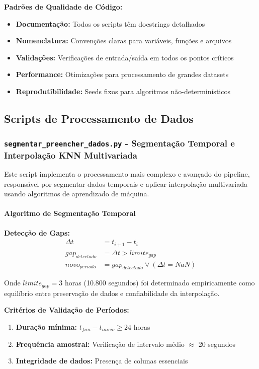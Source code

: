 \textbf{Padrões de Qualidade de Código:}

\begin{itemize}
    \item \textbf{Documentação:} Todos os scripts têm docstrings detalhados
    \item \textbf{Nomenclatura:} Convenções claras para variáveis, funções e arquivos
    \item \textbf{Validações:} Verificações de entrada/saída em todos os pontos críticos
    \item \textbf{Performance:} Otimizações para processamento de grandes datasets
    \item \textbf{Reprodutibilidade:} Seeds fixos para algoritmos não-determinísticos
\end{itemize}

\subsection{Scripts de Processamento de Dados}

\subsubsection{\texttt{segmentar\_preencher\_dados.py} - Segmentação Temporal e Interpolação KNN Multivariada}

Este script implementa o processamento mais complexo e avançado do pipeline, responsável por segmentar dados temporais e aplicar interpolação multivariada usando algoritmos de aprendizado de máquina.

\paragraph{Algoritmo de Segmentação Temporal}

\textbf{Detecção de Gaps:}
\begin{align}
\Delta t &= t_{i+1} - t_i \\
gap_{detectado} &= \Delta t > limite_{gap} \\
novo_{periodo} &= gap_{detectado} \lor (\Delta t = NaN)
\end{align}

Onde $limite_{gap} = 3$ horas (10.800 segundos) foi determinado empiricamente como equilíbrio entre preservação de dados e confiabilidade da interpolação.

\textbf{Critérios de Validação de Períodos:}
\begin{enumerate}
    \item \textbf{Duração mínima:} $t_{fim} - t_{inicio} \geq 24$ horas
    \item \textbf{Frequência amostral:} Verificação de intervalo médio $\approx$ 20 segundos
    \item \textbf{Integridade de dados:} Presença de colunas essenciais
\end{enumerate}

